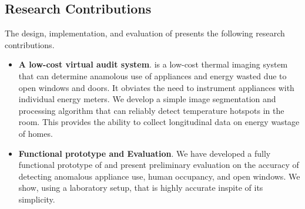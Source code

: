 \subsection*{Research Contributions}

The design, implementation, and evaluation of {\IRLeak} presents the following research contributions.

\begin{itemize}
	
 \item {\bf A low-cost virtual audit system}. {\IRLeak} is a low-cost thermal imaging system that can determine anamolous use of appliances and energy wasted due to open windows and doors. It obviates the need to 
 instrument appliances with individual energy meters. We develop a simple
 image segmentation and processing algorithm that can reliably detect
 temperature hotspots in the room. This provides the ability to collect
 longitudinal data on energy wastage of homes.
 
 \item {\bf Functional prototype and Evaluation}. We have developed a
 fully functional prototype of {\IRLeak} and present preliminary evaluation
 on the accuracy of detecting anomalous appliance use, human occupancy, and open windows. We show, using a laboratory setup,
 that {\IRLeak} is highly accurate inspite of its simplicity.



 \end{itemize}



